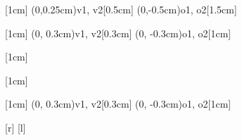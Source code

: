 \documentclass{article}
\begin{document}
\begin{tfeyn}[1cm][1cm]
  [1cm]
  \tfcol(0,0.25cm){v1, v2}[0.5cm]
  \tfcol(0,-0.5cm){o1, o2}[1.5cm]


\end{tfeyn}

\begin{tfeyn}[]
  \def\colsep{1cm}
  \let\lastvertex\undefined
  [1cm]
  \tfcol(0, 0.3cm){v1, v2}[0.3cm]
  \tfcol(0, -0.3cm){o1, o2}[1cm]


\end{tfeyn}

\begin{tfeyn}[]
  \def\colsep{1cm}
  \let\lastvertex\undefined
  [1cm]


\end{tfeyn}

\begin{tfeyn}[]
  \let\lastvertex\undefined
  [1cm]


\end{tfeyn}

\begin{tfeyn}[1cm]
  \let\lastvertex\undefined
  [1cm]
  \tfcol(0, 0.3cm){v1, v2}[0.3cm]
  \tfcol(0, -0.3cm){o1, o2}[1cm]



\end{tfeyn}

\begin{tfeyn}
  [r]
  [l]
\end{tfeyn}
\end{document}
